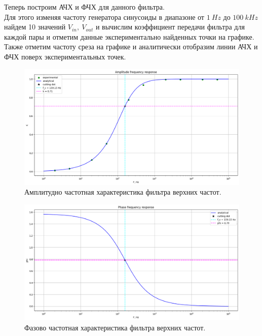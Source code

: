 \documentclass[12pt]{article}
\begin{document}
Теперь построим АЧХ и ФЧХ для данного фильтра. \\
Для этого изменяя частоту генератора синусоиды в диапазоне от $1 \ Hz$ до $100 \ kHz$ найдем 10 значений $V_{in}, \ V_{out}$ и вычислим коэффициент передачи фильтра для каждой пары и отметим данные экспериментально найденных точки на графике. \\
Также отметим частоту среза на графике и аналитически отобразим линии АЧХ и ФЧХ поверх экспериментальных точек.

\begin{figure}[H]
    \centering
    \includegraphics[width=\textwidth]{2_afr.png}
    \caption{Амплитудно частотная характеристика фильтра верхних частот.}
    \label{fig:2_afr}
\end{figure}

\begin{figure}[H]
    \centering
    \includegraphics[width=\textwidth]{2_pfr.png}
    \caption{Фазово частотная характеристика фильтра верхних частот.}
    \label{fig:2_pfr}
\end{figure}
\end{document}
